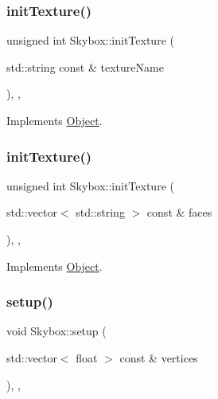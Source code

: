 \subsubsection{\texorpdfstring{init\+Texture()}{initTexture()}\hspace{0.1cm}{\footnotesize\ttfamily [1/2]}}
{\footnotesize\ttfamily unsigned int Skybox\+::init\+Texture (\begin{DoxyParamCaption}\item[{std\+::string const \&}]{texture\+Name }\end{DoxyParamCaption})\hspace{0.3cm}{\ttfamily [override]}, {\ttfamily [protected]}, {\ttfamily [virtual]}}



Implements \hyperlink{classObject_a12b8309292a39b028d5a7b1dfca98cb1}{Object}.

\mbox{\label{classSkybox_ae290e8e7374b983c153b581500cd11f3}} 
\subsubsection{\texorpdfstring{init\+Texture()}{initTexture()}\hspace{0.1cm}{\footnotesize\ttfamily [2/2]}}
{\footnotesize\ttfamily unsigned int Skybox\+::init\+Texture (\begin{DoxyParamCaption}\item[{std\+::vector$<$ std\+::string $>$ const \&}]{faces }\end{DoxyParamCaption})\hspace{0.3cm}{\ttfamily [override]}, {\ttfamily [protected]}, {\ttfamily [virtual]}}



Implements \hyperlink{classObject_ac18935ff7831cb35dc462b581d2ccf3c}{Object}.

\mbox{\label{classSkybox_a3f99748c514edd99809a6977f354702f}} 
\subsubsection{\texorpdfstring{setup()}{setup()}}
{\footnotesize\ttfamily void Skybox\+::setup (\begin{DoxyParamCaption}\item[{std\+::vector$<$ float $>$ const \&}]{vertices }\end{DoxyParamCaption})\hspace{0.3cm}{\ttfamily [override]}, {\ttfamily [protected]}, {\ttfamily [virtual]}}



